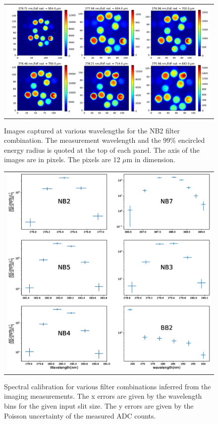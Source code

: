 \documentclass[12pt]{spieman}  %
\begin{document}
\begin{figure}[ht]
\begin{center}
\begin{tabular}{c}
\includegraphics[width=0.8\linewidth]{nb2_images.pdf}
\end{tabular}
\end{center}
\caption 
{ \label{fig:nb2_images} Images captured at various wavelengths for the NB2 filter combination. The measurement wavelength and the 99\% encircled energy radius is quoted at the top of each panel. The axis of the images are in pixels. The pixels are 12 $\mu$m in dimension.} 
\end{figure}

\begin{figure}[ht]
\begin{center}
\begin{tabular}{c}
\includegraphics[trim={2.5cm 2.5cm 3cm 4cm},clip,width=0.8\linewidth]{spec_calib.eps}
\end{tabular}
\end{center}
\caption 
{ \label{fig:sepc_calib} Spectral calibration for various filter combinations inferred from the imaging measurements. The x errors are given by the wavelength bins for the given input slit size. The y errors are given by the Poisson uncertainty of the measured ADC counts.} 
\end{figure}
\end{document}

